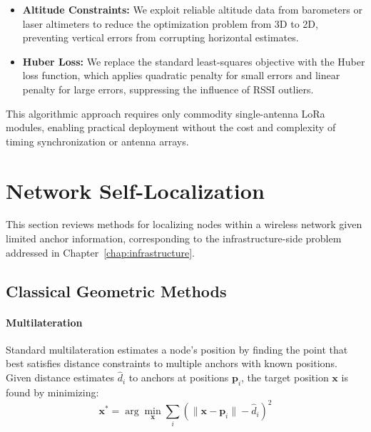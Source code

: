 \documentclass[master,final,11pt]{iscs-thesis}
\begin{document}
\begin{itemize}
    \item \textbf{Altitude Constraints:} We exploit reliable altitude data from barometers or laser altimeters to reduce the optimization problem from 3D to 2D, preventing vertical errors from corrupting horizontal estimates.
    
    \item \textbf{Huber Loss:} We replace the standard least-squares objective with the Huber loss function, which applies quadratic penalty for small errors and linear penalty for large errors, suppressing the influence of RSSI outliers.
\end{itemize}

This algorithmic approach requires only commodity single-antenna LoRa modules, enabling practical deployment without the cost and complexity of timing synchronization or antenna arrays.

\section{Network Self-Localization}
\label{sec:network_localization_related}

This section reviews methods for localizing nodes within a wireless network given limited anchor information, corresponding to the infrastructure-side problem addressed in Chapter~\ref{chap:infrastructure}.

\subsection{Classical Geometric Methods}

\paragraph{Multilateration}
Standard multilateration estimates a node's position by finding the point that best satisfies distance constraints to multiple anchors with known positions.
Given distance estimates $\hat{d}_i$ to anchors at positions $\mathbf{p}_i$, the target position $\mathbf{x}$ is found by minimizing:
\begin{equation}
    \mathbf{x}^* = \arg\min_{\mathbf{x}} \sum_{i} \left( \|\mathbf{x} - \mathbf{p}_i\| - \hat{d}_i \right)^2
    \label{eq:multilateration}
\end{equation}
\end{document}
